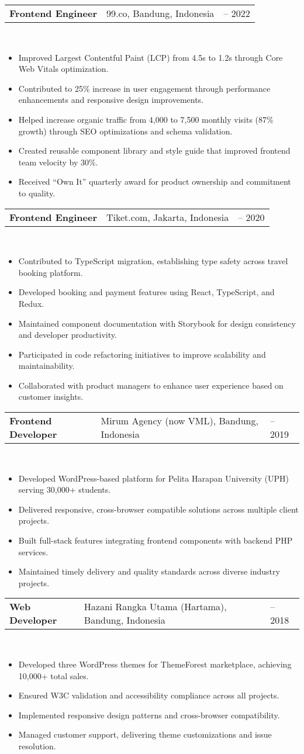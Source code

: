 \documentclass[a4paper, 11pt]{article}
\newcommand{\resumeItem}[1]{
  \item\small{
    {#1 \vspace{-2pt}}
  }
}
\newcommand{\resumeSubheading}[4]{
  \vspace{-2pt}\item
    \begin{tabularx}{0.987\textwidth}[t]{
  >{\raggedright\arraybackslash}X
  >{\centering\arraybackslash}X
  >{\raggedleft\arraybackslash}X }
      \textbf{#1} & #2 & #3 \\
    \end{tabularx}
    \textit{\small#4}\\
    \vspace{-7pt}
}
\newcommand{\resumeItemListStart}{\begin{itemize}[leftmargin=0.22in]}
\newcommand{\resumeItemListEnd}{\end{itemize}\vspace{-20pt}}
\begin{document}
        \resumeSubheading
            {Frontend Engineer}{99.co, Bandung, Indonesia}{2020 -- 2022}{}
            \resumeItemListStart
                \resumeItem{Improved Largest Contentful Paint (LCP) from 4.5s to 1.2s through Core Web Vitals optimization.}
                \resumeItem{Contributed to 25\% increase in user engagement through performance enhancements and responsive design improvements.}
                \resumeItem{Helped increase organic traffic from 4,000 to 7,500 monthly visits (87\% growth) through SEO optimizations and schema validation.}
                \resumeItem{Created reusable component library and style guide that improved frontend team velocity by 30\%.}
                \resumeItem{Received ``Own It'' quarterly award for product ownership and commitment to quality.}
            \resumeItemListEnd

        \resumeSubheading
            {Frontend Engineer}{Tiket.com, Jakarta, Indonesia}{2019 -- 2020}{}
            \resumeItemListStart
                \resumeItem{Contributed to TypeScript migration, establishing type safety across travel booking platform.}
                \resumeItem{Developed booking and payment features using React, TypeScript, and Redux.}
                \resumeItem{Maintained component documentation with Storybook for design consistency and developer productivity.}
                \resumeItem{Participated in code refactoring initiatives to improve scalability and maintainability.}
                \resumeItem{Collaborated with product managers to enhance user experience based on customer insights.}
            \resumeItemListEnd

        \resumeSubheading
            {Frontend Developer}{Mirum Agency (now VML), Bandung, Indonesia}{2018 -- 2019}{}
            \resumeItemListStart
                \resumeItem{Developed WordPress-based platform for Pelita Harapan University (UPH) serving 30,000+ students.}
                \resumeItem{Delivered responsive, cross-browser compatible solutions across multiple client projects.}
                \resumeItem{Built full-stack features integrating frontend components with backend PHP services.}
                \resumeItem{Maintained timely delivery and quality standards across diverse industry projects.}
            \resumeItemListEnd

        \resumeSubheading
            {Web Developer}{Hazani Rangka Utama (Hartama), Bandung, Indonesia}{2017 -- 2018}{}
            \resumeItemListStart
                \resumeItem{Developed three WordPress themes for ThemeForest marketplace, achieving 10,000+ total sales.}
                \resumeItem{Ensured W3C validation and accessibility compliance across all projects.}
                \resumeItem{Implemented responsive design patterns and cross-browser compatibility.}
                \resumeItem{Managed customer support, delivering theme customizations and issue resolution.}
            \resumeItemListEnd
\end{document}
